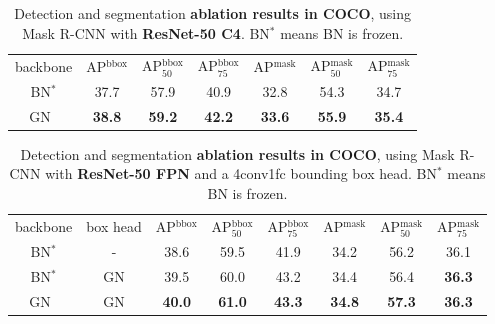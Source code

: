 \documentclass[10pt,twocolumn,letterpaper]{article}
\newcommand{\f}{$^\text{*}$\xspace}
\begin{document}
\renewcommand\arraystretch{1.15}
\setlength{\tabcolsep}{3.5pt}
\begin{table}[t]
\centering
\small
\begin{tabular}{c|ccc|ccc}
\hline
{\fontsize{7pt}{1em}\selectfont backbone} & AP$^\text{bbox}$ & AP$^\text{bbox}_\text{50}$ & AP$^\text{bbox}_\text{75}$ & AP$^\text{mask}$ & AP$^\text{mask}_\text{50}$ & AP$^\text{mask}_\text{75}$ \\
\shline
BN\f  & 37.7 & 57.9 & 40.9 & 32.8 & 54.3 & 34.7 \\
GN~ & \textbf{38.8} & \textbf{59.2} & \textbf{42.2} & \textbf{33.6} & \textbf{55.9} & \textbf{35.4} \\
\hline
\end{tabular}
\vspace{.5em}
\caption{Detection and segmentation \textbf{ablation results in COCO}, using Mask R-CNN with \textbf{ResNet-50 C4}. BN\f means BN is frozen.
}\label{tab:coco_bn_gn}
\vspace{.3em}
\end{table}
\renewcommand\arraystretch{1.15}
\setlength{\tabcolsep}{1.8pt}
\begin{table}[t]
\centering
\small
\begin{tabular}{c|c|ccc|ccc}
\hline
{\fontsize{7pt}{1em}\selectfont backbone} & {\fontsize{7pt}{1em}\selectfont box head} & AP$^\text{bbox}$ & AP$^\text{bbox}_\text{50}$ & AP$^\text{bbox}_\text{75}$ & AP$^\text{mask}$ & AP$^\text{mask}_\text{50}$ & AP$^\text{mask}_\text{75}$ \\
\shline
BN\f  & - & 38.6 & 59.5 & 41.9 & 34.2 & 56.2 & 36.1 \\
BN\f & GN & 39.5 & 60.0 & 43.2 & 34.4 & 56.4 & \textbf{36.3} \\
GN~ & GN & \textbf{40.0} & \textbf{61.0} & \textbf{43.3} & \textbf{34.8} & \textbf{57.3} & \textbf{36.3} \\
\hline
\end{tabular}
\vspace{.5em}
\caption{Detection and segmentation \textbf{ablation results in COCO}, using Mask R-CNN with \textbf{ResNet-50 FPN} and a 4conv1fc bounding box head. BN\f means BN is frozen.
}\label{tab:coco_bn_gn_fpn}
\vspace{.3em}
\end{table}
\end{document}
